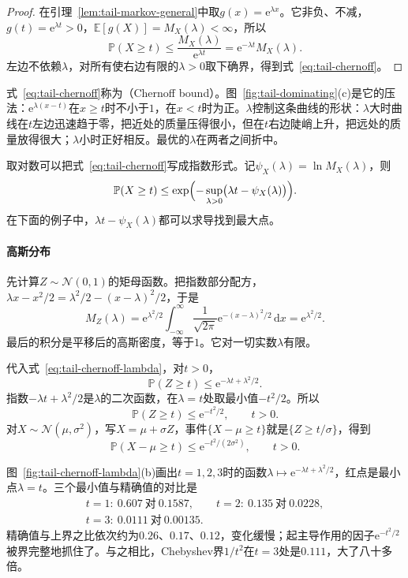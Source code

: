 \begin{proof}
在引理~\ref{lem:tail-markov-general}中取$g(x)=\mathrm{e}^{\lambda x}$。它非负、不减，$g(t)=\mathrm{e}^{\lambda t}>0$，$\mathbb{E}[g(X)]=M_X(\lambda)<\infty$，所以
\[
 \mathbb{P}(X\geq t)\leq\frac{M_X(\lambda)}{\mathrm{e}^{\lambda t}}=\mathrm{e}^{-\lambda t}M_X(\lambda) .
\]
左边不依赖$\lambda$，对所有使右边有限的$\lambda>0$取下确界，得到式~\eqref{eq:tail-chernoff}。
\end{proof}

式~\eqref{eq:tail-chernoff}称为（Chernoff bound）。图~\ref{fig:tail-dominating}(c)是它的压法：$\mathrm{e}^{\lambda(x-t)}$在$x\geq t$时不小于$1$，在$x<t$时为正。$\lambda$控制这条曲线的形状：$\lambda$大时曲线在$t$左边迅速趋于零，把近处的质量压得很小，但在$t$右边陡峭上升，把远处的质量放得很大；$\lambda$小时正好相反。最优的$\lambda$在两者之间折中。

取对数可以把式~\eqref{eq:tail-chernoff}写成指数形式。记$\psi_X(\lambda)=\ln M_X(\lambda)$，则
\begin{equation}
 \mathbb{P}(X\geq t)\leq\exp\Bigl(-\sup_{\lambda>0}\bigl(\lambda t-\psi_X(\lambda)\bigr)\Bigr) .
 \label{eq:tail-chernoff-exponent}
\end{equation}
在下面的例子中，$\lambda t-\psi_X(\lambda)$都可以求导找到最大点。

\paragraph{高斯分布}
先计算$Z\sim\mathcal{N}(0,1)$的矩母函数。把指数部分配方，$\lambda x-x^2/2=\lambda^2/2-(x-\lambda)^2/2$，于是
\[
 M_Z(\lambda)=\mathrm{e}^{\lambda^2/2}\int_{-\infty}^{\infty}\frac{1}{\sqrt{2\pi}}\mathrm{e}^{-(x-\lambda)^2/2}\,\mathrm{d}x=\mathrm{e}^{\lambda^2/2} .
\]
最后的积分是平移后的高斯密度，等于$1$。它对一切实数$\lambda$有限。

代入式~\eqref{eq:tail-chernoff-lambda}，对$t>0$，
\[
 \mathbb{P}(Z\geq t)\leq\mathrm{e}^{-\lambda t+\lambda^2/2} .
\]
指数$-\lambda t+\lambda^2/2$是$\lambda$的二次函数，在$\lambda=t$处取最小值$-t^2/2$。所以
\begin{equation}
 \mathbb{P}(Z\geq t)\leq\mathrm{e}^{-t^2/2},\qquad t>0 .
 \label{eq:tail-gauss-chernoff}
\end{equation}
对$X\sim\mathcal{N}(\mu,\sigma^2)$，写$X=\mu+\sigma Z$，事件$\{X-\mu\geq t\}$就是$\{Z\geq t/\sigma\}$，得到
\[
 \mathbb{P}(X-\mu\geq t)\leq\mathrm{e}^{-t^2/(2\sigma^2)},\qquad t>0 .
\]

图~\ref{fig:tail-chernoff-lambda}(b)画出$t=1,2,3$时的函数$\lambda\mapsto\mathrm{e}^{-\lambda t+\lambda^2/2}$，红点是最小点$\lambda=t$。三个最小值与精确值的对比是
\[
 \begin{gathered}
 t=1:\ 0.607\ \text{对}\ 0.1587,\qquad t=2:\ 0.135\ \text{对}\ 0.0228,\\
 t=3:\ 0.0111\ \text{对}\ 0.00135 .
 \end{gathered}
\]
精确值与上界之比依次约为$0.26$、$0.17$、$0.12$，变化缓慢；起主导作用的因子$\mathrm{e}^{-t^2/2}$被界完整地抓住了。与之相比，Chebyshev界$1/t^2$在$t=3$处是$0.111$，大了八十多倍。

